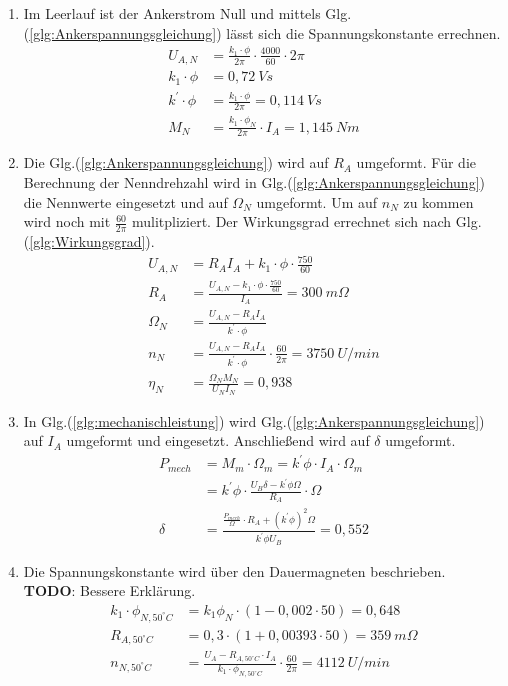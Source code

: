 \begin{solution}
\begin{enumerate}
\item Im Leerlauf ist der Ankerstrom Null und mittels Glg.(\ref{glg:Ankerspannungsgleichung}) lässt sich die Spannungskonstante errechnen.
\begin{align}
U_{A,N} &= \frac{k_1 \cdot \phi}{2 \pi} \cdot \frac{4000}{60} \cdot 2 \pi\\
k_1 \cdot \phi &= 0,72~Vs\\
k^{'} \cdot \phi &= \frac{k_1 \cdot \phi}{2 \pi} = 0,114~Vs\\
M_N &= \frac{k_1 \cdot \phi_N}{2 \pi} \cdot I_A = 1,145~Nm
\end{align}
\item Die Glg.(\ref{glg:Ankerspannungsgleichung}) wird auf $R_A$ umgeformt. Für die Berechnung der Nenndrehzahl wird in Glg.(\ref{glg:Ankerspannungsgleichung}) die Nennwerte eingesetzt und auf $\Omega_N$ umgeformt. Um auf $n_N$ zu kommen wird noch mit $\frac{60}{2 \pi}$ mulitpliziert. Der Wirkungsgrad errechnet sich nach Glg.(\ref{glg:Wirkungsgrad}).
\begin{align}
U_{A,N} &= R_A I_A + k_1\cdot \phi \cdot \frac{750}{60}\\
R_A &= \frac{U_{A,N} -k_1\cdot \phi \cdot \frac{750}{60}}{I_A} = 300~m\Omega\\
\Omega_N &= \frac{U_{A,N} - R_A I_A}{k^{'}\cdot \phi}\\
n_N &= \frac{U_{A,N} - R_A I_A}{k^{'}\cdot \phi} \cdot \frac{60}{2 \pi} = 3750 ~U /min\\
\eta_N &= \frac{\Omega_N M_N}{U_N I_N} = 0,938
\end{align}
\item In Glg.(\ref{glg:mechanischleistung}) wird Glg.(\ref{glg:Ankerspannungsgleichung}) auf $I_A$ umgeformt und eingesetzt. Anschließend wird auf $\delta$ umgeformt.
\begin{align}
P_{mech} &=M_m \cdot \Omega_m = k^{'} \phi \cdot I_A \cdot \Omega_m\\
&= k^{'} \phi \cdot \frac{U_B \delta - k^{'} \phi \Omega}{R_A} \cdot \Omega\\
\delta &= \frac{\frac{P_{mech}}{\Omega} \cdot R_A + (k^{'} \phi)^2 \Omega}{k^{'} \phi U_B}=0,552
\end{align}
\item Die Spannungskonstante wird über den Dauermagneten beschrieben.\\
\textbf{TODO}: Bessere Erklärung.
\begin{align}
k_1 \cdot \phi_{N,50^\circ C}&= k_1 \phi_N \cdot (1 - 0,002 \cdot 50)= 0,648\\
R_{A,50^\circ C} &= 0,3 \cdot (1+ 0,00393 \cdot 50) = 359~m\Omega\\
n_{N,50^\circ C} &= \frac{U_A -R_{A,50^\circ C} \cdot I_A}{k_1 \cdot \phi_{N,50^\circ C}}\cdot \frac{60}{2 \pi} = 4112 ~U/min
\end{align}
\end{enumerate}
\end{solution}